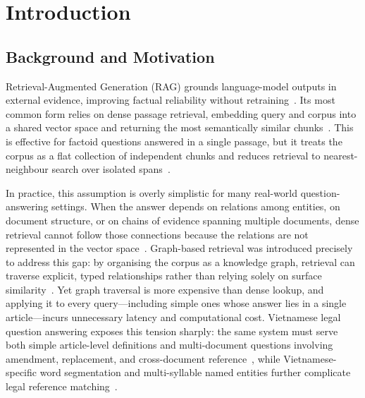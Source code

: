 \section{Introduction}\label{sec:intro}

\subsection{Background and Motivation}\label{subsec:background}

Retrieval-Augmented Generation (RAG) grounds language-model outputs in
external evidence, improving factual reliability without
retraining~\cite{lewis2020rag,guu2020realm}. Its most common form relies on
dense passage retrieval, embedding query and corpus into a shared vector
space and returning the most semantically similar chunks~\cite{karpukhin2020dpr}.
This is effective for factoid questions answered in a single passage, but it
treats the corpus as a flat collection of independent chunks and reduces
retrieval to nearest-neighbour search over isolated
spans~\cite{karpukhin2020dpr,trivedi2023interleaving}.

In practice, this assumption is overly simplistic for many real-world
question-answering settings. When the answer depends on relations among
entities, on document structure, or on chains of evidence spanning multiple
documents, dense retrieval cannot follow those connections because the
relations are not represented in the vector space~\cite{trivedi2023interleaving}.
Graph-based retrieval was introduced precisely to address this gap: by
organising the corpus as a knowledge graph, retrieval can traverse explicit,
typed relationships rather than relying solely on surface
similarity~\cite{edge2024graphrag,wang2024kgp,gutierrez2024hipporag}. Yet
graph traversal is more expensive than dense lookup, and applying it to every
query---including simple ones whose answer lies in a single article---incurs
unnecessary latency and computational cost. Vietnamese legal question
answering exposes this tension sharply: the same system must serve both
simple article-level definitions and multi-document questions involving
amendment, replacement, and cross-document
reference~\cite{chalkidis2020legalbert,zhong2020nlp_law,sovrano2020legalkg},
while Vietnamese-specific word segmentation and multi-syllable named entities
further complicate legal reference matching~\cite{nguyen2020phobert,vu2018vncorenlp}.

